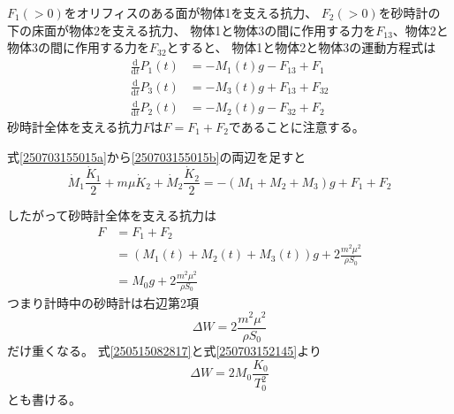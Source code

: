\documentclass[]{article}
\begin{document}



$F_1 (>0)$をオリフィスのある面が物体1を支える抗力、
$F_2 (>0)$を砂時計の下の床面が物体2を支える抗力、
物体1と物体3の間に作用する力を$F_{13}$、物体2と物体3の間に作用する力を$F_{32}$とすると、
物体1と物体2と物体3の運動方程式は
\begin{align}
   \frac{\mathrm{d} }{\mathrm{d} t}  P_1(t) &=   - M_1(t) g - F_{13} + F_1\label{250703155015a}  \\
   \frac{\mathrm{d} }{\mathrm{d} t} P_3(t) &=  - M_3(t) g  + F_{13} + F_{32} \label{2507031550153c} \\
   \frac{\mathrm{d} }{\mathrm{d} t} P_2(t)  &=  - M_2(t) g  - F_{32} + F_2 \label{250703155015b} 
\end{align}
砂時計全体を支える抗力$F$は$F=F_1+F_2$であることに注意する。


式\eqref{250703155015a}から\eqref{250703155015b}の両辺を足すと
\begin{equation} \label{250917103450} 
  \dot{M}_1 \frac{\dot{K}_1}{2}  + m \mu \dot{K}_2 + \dot{M}_2 \frac{\dot{K}_2}{2} =  -(M_1+M_2+M_3) g + F_1 + F_2
\end{equation}


したがって砂時計全体を支える抗力は
\begin{align}
   F &= F_1 + F_2  \label{250703170301a} \\
   &=(M_1(t) + M_2(t)  +M_3(t) )g +  2\frac{m^2\mu^2}{\rho S_0}   \label{250703170301b} \\
   &=  M_0 g +  2 \frac{m^2\mu^2}{\rho S_0}   \label{250703170301c} 
\end{align}
つまり計時中の砂時計は右辺第2項
\begin{equation} \label{250703173105} 
   \Delta W  = 2 \frac{m^2\mu^2}{\rho S_0} 
\end{equation}
だけ重くなる。
式\eqref{250515082817}と式\eqref{250703152145}より
\begin{equation} \label{250703173052} 
    \Delta W  =  2M_0 \frac{K_0}{T_0^2} 
\end{equation}
とも書ける。
\end{document}
